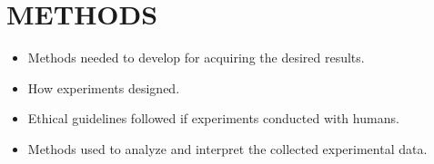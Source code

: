 \chapter{METHODS}
\label{chapter:methods}
\begin{itemize}
\item Methods needed to develop for acquiring the desired results.
\item How experiments designed.
\item Ethical guidelines followed if experiments conducted with humans.
\item Methods used to analyze and interpret the collected experimental data.
\end{itemize}
